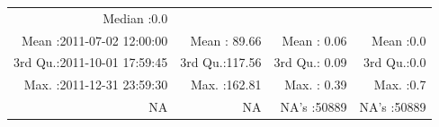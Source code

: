 \documentclass[
  10pt,
  a4paper,oneside]{article}
\begin{document}
\begin{longtable}[]{@{}rrrr@{}}
\begin{minipage}[t]{0.18\columnwidth}
Median :0.0\strut
\end{minipage}\tabularnewline
\begin{minipage}[t]{0.34\columnwidth}\raggedleft
Mean :2011-07-02 12:00:00\strut
\end{minipage} & \begin{minipage}[t]{0.19\columnwidth}\raggedleft
Mean : 89.66\strut
\end{minipage} & \begin{minipage}[t]{0.18\columnwidth}\raggedleft
Mean : 0.06\strut
\end{minipage} & \begin{minipage}[t]{0.18\columnwidth}\raggedleft
Mean :0.0\strut
\end{minipage}\tabularnewline
\begin{minipage}[t]{0.34\columnwidth}\raggedleft
3rd Qu.:2011-10-01 17:59:45\strut
\end{minipage} & \begin{minipage}[t]{0.19\columnwidth}\raggedleft
3rd Qu.:117.56\strut
\end{minipage} & \begin{minipage}[t]{0.18\columnwidth}\raggedleft
3rd Qu.: 0.09\strut
\end{minipage} & \begin{minipage}[t]{0.18\columnwidth}\raggedleft
3rd Qu.:0.0\strut
\end{minipage}\tabularnewline
\begin{minipage}[t]{0.34\columnwidth}\raggedleft
Max. :2011-12-31 23:59:30\strut
\end{minipage} & \begin{minipage}[t]{0.19\columnwidth}\raggedleft
Max. :162.81\strut
\end{minipage} & \begin{minipage}[t]{0.18\columnwidth}\raggedleft
Max. : 0.39\strut
\end{minipage} & \begin{minipage}[t]{0.18\columnwidth}\raggedleft
Max. :0.7\strut
\end{minipage}\tabularnewline
\begin{minipage}[t]{0.34\columnwidth}\raggedleft
NA\strut
\end{minipage} & \begin{minipage}[t]{0.19\columnwidth}\raggedleft
NA\strut
\end{minipage} & \begin{minipage}[t]{0.18\columnwidth}\raggedleft
NA's :50889\strut
\end{minipage} & \begin{minipage}[t]{0.18\columnwidth}\raggedleft
NA's :50889\strut
\end{minipage}\tabularnewline
\bottomrule
\end{longtable}
\end{document}
